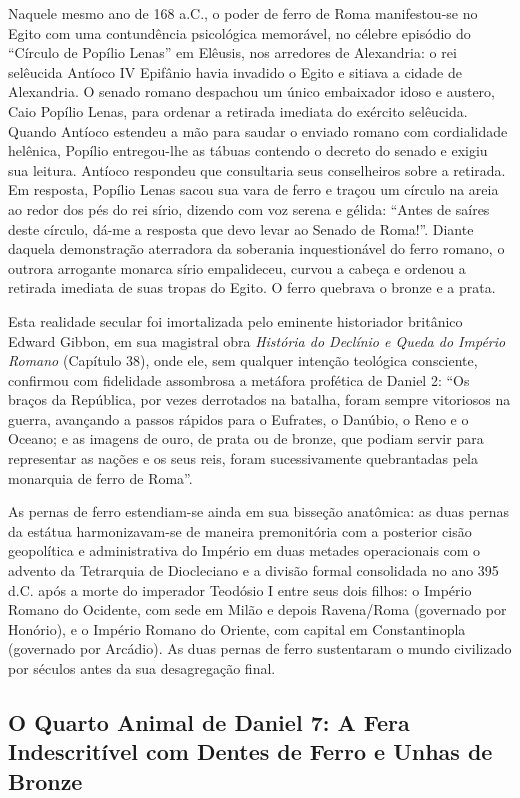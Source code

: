 \documentclass[11pt,a4paper,openany]{book}
\begin{document}
Naquele mesmo ano de 168 a.C., o poder de ferro de Roma manifestou-se no Egito com uma contundência psicológica memorável, no célebre episódio do ``Círculo de Popílio Lenas'' em Elêusis, nos arredores de Alexandria: o rei selêucida Antíoco IV Epifânio havia invadido o Egito e sitiava a cidade de Alexandria. O senado romano despachou um único embaixador idoso e austero, Caio Popílio Lenas, para ordenar a retirada imediata do exército selêucida. Quando Antíoco estendeu a mão para saudar o enviado romano com cordialidade helênica, Popílio entregou-lhe as tábuas contendo o decreto do senado e exigiu sua leitura. Antíoco respondeu que consultaria seus conselheiros sobre a retirada. Em resposta, Popílio Lenas sacou sua vara de ferro e traçou um círculo na areia ao redor dos pés do rei sírio, dizendo com voz serena e gélida: ``Antes de saíres deste círculo, dá-me a resposta que devo levar ao Senado de Roma!''. Diante daquela demonstração aterradora da soberania inquestionável do ferro romano, o outrora arrogante monarca sírio empalideceu, curvou a cabeça e ordenou a retirada imediata de suas tropas do Egito. O ferro quebrava o bronze e a prata.

Esta realidade secular foi imortalizada pelo eminente historiador britânico Edward Gibbon, em sua magistral obra \textit{História do Declínio e Queda do Império Romano} (Capítulo 38), onde ele, sem qualquer intenção teológica consciente, confirmou com fidelidade assombrosa a metáfora profética de Daniel 2:
``Os braços da República, por vezes derrotados na batalha, foram sempre vitoriosos na guerra, avançando a passos rápidos para o Eufrates, o Danúbio, o Reno e o Oceano; e as imagens de ouro, de prata ou de bronze, que podiam servir para representar as nações e os seus reis, foram sucessivamente quebrantadas pela monarquia de ferro de Roma''.

As pernas de ferro estendiam-se ainda em sua bisseção anatômica: as duas pernas da estátua harmonizavam-se de maneira premonitória com a posterior cisão geopolítica e administrativa do Império em duas metades operacionais com o advento da Tetrarquia de Diocleciano e a divisão formal consolidada no ano 395 d.C. após a morte do imperador Teodósio I entre seus dois filhos: o Império Romano do Ocidente, com sede em Milão e depois Ravena/Roma (governado por Honório), e o Império Romano do Oriente, com capital em Constantinopla (governado por Arcádio). As duas pernas de ferro sustentaram o mundo civilizado por séculos antes da sua desagregação final.


\subsection{O Quarto Animal de Daniel 7: A Fera Indescritível com Dentes de Ferro e Unhas de Bronze}
\end{document}
